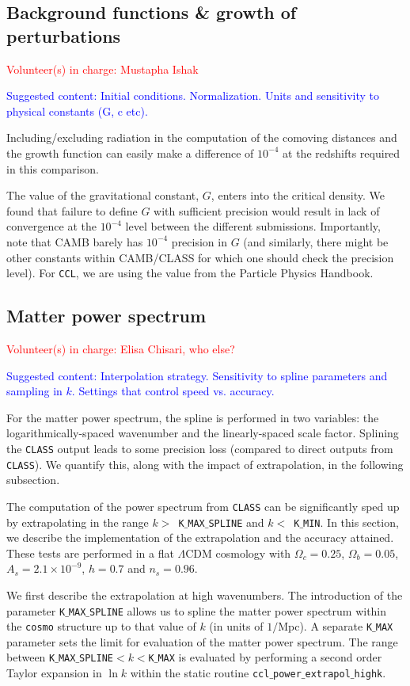 \documentclass[\docopts]{\docclass}
\newcommand{\vol}[1]{\textcolor{red}{Volunteer(s) in charge: #1}}
\newcommand{\cont}[1]{\textcolor{blue}{Suggested content: #1}}
\newcommand{\ccl}{{\tt CCL}\xspace}
\begin{document}
\subsection{Background functions \& growth of perturbations}
\vol{Mustapha Ishak}

\cont{Initial conditions. Normalization. Units and sensitivity to physical constants (G, c etc).}

Including/excluding radiation in the computation of the comoving distances and the growth function can easily make a difference of $10^{-4}$ at the redshifts required in this comparison.

The value of the gravitational constant, $G$, enters into the critical density. We found that failure to define $G$ with sufficient precision would result in lack of convergence at the $10^{-4}$ level between the different submissions. Importantly, note that CAMB barely has $10^{-4}$ precision in $G$ (and similarly, there might be other constants within CAMB/CLASS for which one should check the precision level). For \ccl, we are using the value from the Particle Physics Handbook.


\subsection{Matter power spectrum}
\vol{Elisa Chisari, who else?}

\cont{Interpolation strategy. Sensitivity to spline parameters and sampling in $k$. Settings that control speed vs. accuracy. }

For the matter power spectrum, the spline is performed in two variables: the logarithmically-spaced wavenumber and the linearly-spaced scale factor. Splining the {\tt CLASS} output leads to some precision loss (compared to direct outputs from {\tt CLASS}). We quantify this, along with the impact of extrapolation, in the following subsection.

The computation of the power spectrum from {\tt CLASS} can be significantly sped up by extrapolating in the range $k>$~{\tt K$\_$MAX$\_$SPLINE} and $k<$~{\tt K$\_$MIN}. In this section, we describe the implementation of the extrapolation and the accuracy attained. These tests are performed in a flat $\Lambda$CDM cosmology with $\Omega_c=0.25$, $\Omega_b=0.05$, $A_s=2.1\times10^{-9}$, $h=0.7$ and $n_s=0.96$.

We first describe the extrapolation at high wavenumbers. The introduction of the parameter {\tt K$\_$MAX$\_$SPLINE} allows us to spline the matter power spectrum within the {\tt cosmo} structure up to that value of $k$ (in units of $1/$Mpc). A separate {\tt K$\_$MAX} parameter sets the limit for evaluation of the matter power spectrum. The range between {\tt K$\_$MAX$\_$SPLINE}$<k<${\tt K$\_$MAX} is evaluated by performing a second order Taylor expansion in $\ln k$ within the static routine {\tt ccl$\_$power$\_$extrapol$\_$highk}.
\end{document}

